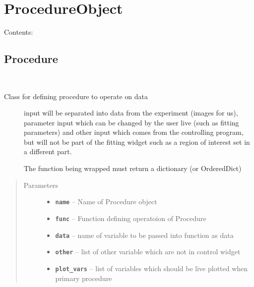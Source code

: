 \documentclass[letterpaper,10pt,english]{sphinxmanual}
\begin{document}
\chapter{ProcedureObject}
\label{ProcedureObject:procedureobject}\label{ProcedureObject::doc}
Contents:


\section{Procedure}
\label{Procedure::doc}\label{Procedure:procedure}

\begin{fulllineitems}
\label{Procedure:ProcedureObject.Procedure}~\begin{description}
\item[{Class for defining procedure to operate on data}] \leavevmode
input will be separated into data from the experiment (images for us),
parameter input which can be changed by the user live (such as fitting parameters)
and other input which comes from the controlling program, but will not be part
of the fitting widget such as a region of interest set in a different part.

The function being wrapped must return a dictionary (or OrderedDict)

\end{description}
\begin{quote}\begin{description}
\item[{Parameters}] \leavevmode\begin{itemize}
\item {} 
\textbf{\texttt{name}} -- Name of Procedure object

\item {} 
\textbf{\texttt{func}} -- Function defining operatoion of Procedure

\item {} 
\textbf{\texttt{data}} -- name of variable to be passed into function as data

\item {} 
\textbf{\texttt{other}} -- list of other variable which are not in control widget

\item {} 
\textbf{\texttt{plot\_vars}} -- list of variables which should be live plotted when primary procedure


\end{itemize}
\end{description}
\end{quote}
\end{fulllineitems}
\end{document}
